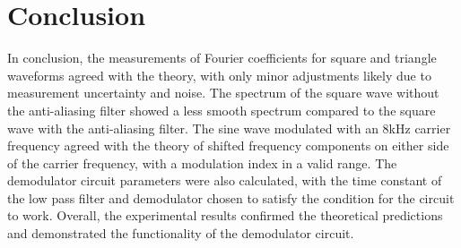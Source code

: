 \documentclass[12pt]{article}
\begin{document}
\section{Conclusion}
In conclusion, the measurements of Fourier coefficients for square and triangle waveforms agreed with the theory, with only minor adjustments likely due to measurement uncertainty and noise.
The spectrum of the square wave without the anti-aliasing filter showed a less smooth spectrum compared to the square wave with the anti-aliasing filter.
The sine wave modulated with an 8kHz carrier frequency agreed with the theory of shifted frequency components on either side of the carrier frequency, with a modulation index in a valid range.
The demodulator circuit parameters were also calculated, with the time constant of the low pass filter and demodulator chosen to satisfy the condition for the circuit to work.
Overall, the experimental results confirmed the theoretical predictions and demonstrated the functionality of the demodulator circuit.
\end{document}
